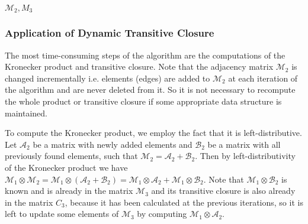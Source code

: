 \begin{algorithm}[h]
\begin{algorithmic}[1]
                \EndFor
        \EndFor
    \EndWhile
\State \Return $\mathcal{M}_2, M_3$
\EndFunction
{}
    \State {}
\EndFunction
{}
    \State {}
\EndFunction
\end{algorithmic}
\end{algorithm}
\subsubsection{Application of Dynamic Transitive Closure}
The most time-consuming steps of the algorithm are the computations of the Kronecker product and transitive closure.
Note that the adjacency matrix $\mathcal{M}_2$ is changed incrementally i.e. elements (edges) are added to $\mathcal{M}_2$ at each iteration of the algorithm and are never deleted from it.
So it is not necessary to recompute the whole product or transitive closure if some appropriate data structure is maintained.

To compute the Kronecker product, we employ the fact that it is left-distributive.
Let $\mathcal{A}_2$ be a matrix with newly added elements and $\mathcal{B}_2$ be a matrix with all previously found elements, such that $\mathcal{M}_2 = \mathcal{A}_2 + \mathcal{B}_2$.
Then by left-distributivity of the Kronecker product we have $\mathcal{M}_1 \otimes \mathcal{M}_2 = \mathcal{M}_1 \otimes (\mathcal{A}_2 + \mathcal{B}_2) = \mathcal{M}_1\otimes \mathcal{A}_2 + \mathcal{M}_1 \otimes \mathcal{B}_2$.
Note that $\mathcal{M}_1 \otimes \mathcal{B}_2$ is known and is already in the matrix $\mathcal{M}_3$ and its transitive closure is also already in the matrix $C_3$, because it has been calculated at the previous iterations, so it is left to update some elements of $\mathcal{M}_3$ by computing $\mathcal{M}_1\otimes \mathcal{A}_2$.


